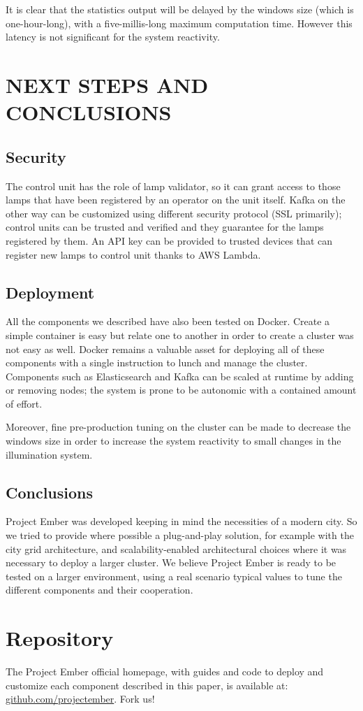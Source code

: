 It is clear that the statistics output will be delayed by the windows size (which is one-hour-long), with a five-millis-long maximum computation time. However this latency is not significant for the system reactivity.

\section{NEXT STEPS AND CONCLUSIONS}

\subsection{Security}
The control unit has the role of lamp validator, so it can grant access to those lamps that have been registered by an operator on the unit itself. Kafka on the other way can be customized using different security protocol (SSL primarily); control units can be trusted and verified and they guarantee for the lamps registered by them. An API key can be provided to trusted devices that can register new lamps to control unit thanks to AWS Lambda. 

\subsection{Deployment}
All the components we described have also been tested on Docker. Create a simple container is easy but relate one to another in order to create a cluster was not easy as well. Docker remains a valuable asset for deploying all of these components with a single instruction to lunch and manage the cluster. Components such as Elasticsearch and Kafka can be scaled at runtime by adding or removing nodes; the system is prone to be autonomic with a contained amount of effort.

Moreover, fine pre-production tuning on the cluster can be made to decrease the windows size in order to increase the system reactivity to small changes in the illumination system.

\subsection{Conclusions}
Project Ember was developed keeping in mind the necessities of a modern city. So we tried to provide where possible a plug-and-play solution, for example with the city grid architecture, and scalability-enabled architectural choices where it was necessary to deploy a larger cluster. We believe Project Ember is ready to be tested on a larger environment, using a real scenario typical values to tune the different components and their cooperation. 

\section*{Repository}
The Project Ember official homepage, with guides and code to deploy and customize each component described in this paper, is available at: \href{https://github.com/projectember}{github.com/projectember}. Fork us!
